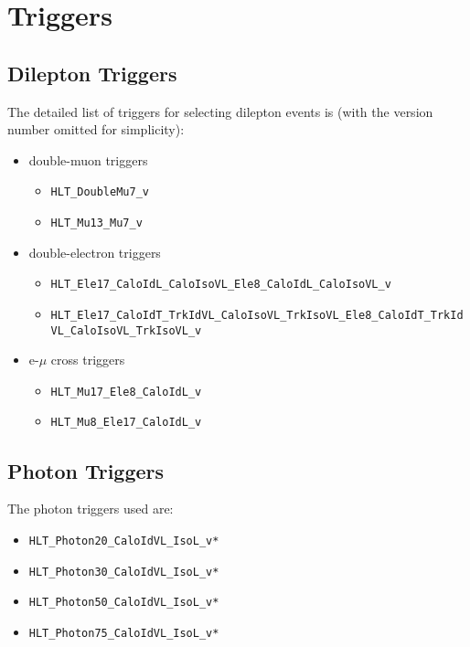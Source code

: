 \section{Triggers}

\subsection{Dilepton Triggers}
\label{app:trigsel}

The detailed list of triggers for selecting dilepton events is (with the version number omitted for simplicity):


\begin{itemize}
\item double-muon triggers
  \begin{itemize}
  \item \verb=HLT_DoubleMu7_v=
  \item \verb=HLT_Mu13_Mu7_v=
  \end{itemize}
\item double-electron triggers
  \begin{itemize}
  \item \verb=HLT_Ele17_CaloIdL_CaloIsoVL_Ele8_CaloIdL_CaloIsoVL_v=
  \item \verb=HLT_Ele17_CaloIdT_TrkIdVL_CaloIsoVL_TrkIsoVL_Ele8_CaloIdT_TrkIdVL_CaloIsoVL_TrkIsoVL_v=
  \end{itemize}
\item e-$\mu$ cross triggers
  \begin{itemize}
  \item \verb=HLT_Mu17_Ele8_CaloIdL_v=
  \item \verb=HLT_Mu8_Ele17_CaloIdL_v=
  \end{itemize}
\end{itemize}


\subsection{Photon Triggers}
\label{app:photrig}

The photon triggers used are:

\begin{itemize}
\item \verb=HLT_Photon20_CaloIdVL_IsoL_v*= %
\item \verb=HLT_Photon30_CaloIdVL_IsoL_v*= %
\item \verb=HLT_Photon50_CaloIdVL_IsoL_v*= %
\item \verb=HLT_Photon75_CaloIdVL_IsoL_v*= %
\end{itemize}

